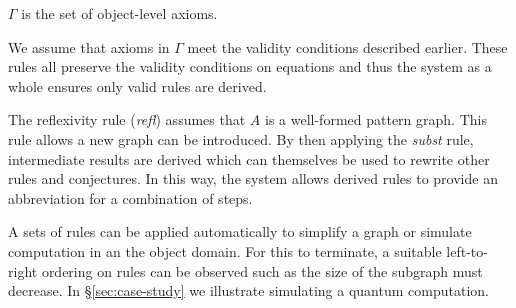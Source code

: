 \documentclass[runningheads]{llncs}
\begin{document}
\noindent $\Gamma$ is the set of object-level axioms. 

We assume
that axioms in $\Gamma$ meet the validity conditions described
earlier. These rules all preserve the validity conditions on equations
and thus the system as a whole ensures only valid rules are derived.

The reflexivity rule (\emph{refl}) assumes that $A$ is a well-formed
pattern graph. This rule allows a new graph can be introduced. By then
applying the \emph{subst} rule, intermediate results are derived which
can themselves be used to rewrite other rules and conjectures.  In
this way, the system allows derived rules to provide an abbreviation
for a combination of steps.

A sets of rules can be applied automatically to simplify a graph or
simulate computation in an the object domain. For this to terminate, a
suitable left-to-right ordering on rules can be observed such as the
size of the subgraph must decrease. In \S\ref{sec:case-study} we
illustrate simulating a quantum computation.





\end{document}
